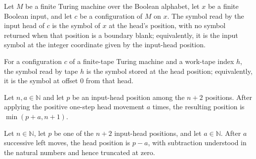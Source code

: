 \begin{theorem}
\label{Complexity.Meyer.inputSymbol_eq_xhat}
\leanok
{}
Let $M$ be a finite Turing machine over the Boolean alphabet, let $x$ be a finite
Boolean input, and let $c$ be a configuration of $M$ on $x$. The symbol read by the
input head of $c$ is the symbol of $x$ at the head's position, with no symbol returned
when that position is a boundary blank; equivalently, it is the input symbol at the
integer coordinate given by the input-head position.
\end{theorem}

\begin{theorem}
\label{Complexity.Meyer.workTapeSymbols_eq_RW}
\leanok
{}
For a configuration $c$ of a finite-tape Turing machine and a work-tape index $h$, the
symbol read by tape $h$ is the symbol stored at the head position; equivalently, it is
the symbol at offset $0$ from that head.
\end{theorem}

\begin{theorem}
\label{Complexity.Meyer.iterate_move_pos}
\leanok
{}
Let $n,a\in\mathbb{N}$ and let $p$ be an input-head position among the $n+2$ positions.
After applying the positive one-step head movement $a$ times, the resulting position is
$\min(p+a,n+1)$.
\end{theorem}

\begin{theorem}
\label{Complexity.Meyer.iterate_move_neg}
\leanok
{}
Let $n\in\mathbb{N}$, let $p$ be one of the $n+2$ input-head positions, and let
$a\in\mathbb{N}$. After $a$ successive left moves, the head position is $p-a$, with
subtraction understood in the natural numbers and hence truncated at zero.
\end{theorem}

